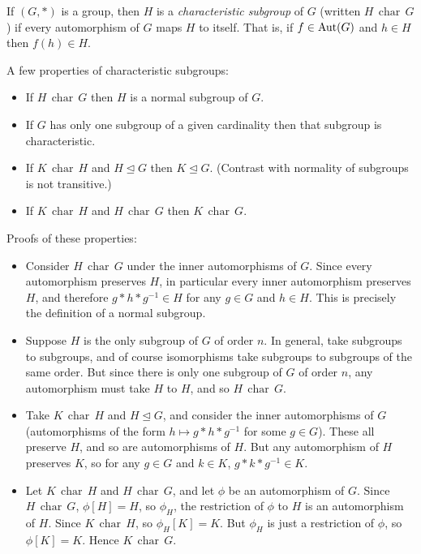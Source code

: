 \documentclass[12pt]{article}
\DeclareMathOperator{\Char}{\,char\,}
\begin{document}

If $(G,*)$ is a group, then $H$ is a \emph{characteristic subgroup} of $G$ (written $H \Char G$) if every automorphism of $G$ maps $H$ to itself.  That is, if $f\in{\rm Aut}(G)$ and $h\in H$ then $f(h)\in H$.

A few properties of characteristic subgroups:
\begin{itemize}
\item If $H\Char G$ then $H$ is a normal subgroup of $G$.
\item If $G$ has only one subgroup of a given cardinality then that subgroup is characteristic.
\item If $K\Char H$ and $H\trianglelefteq G$ then $K\trianglelefteq G$. (Contrast with normality of subgroups is not transitive.)
\item If $K\Char H$ and $H\Char G$ then $K\Char G$.
\end{itemize}

Proofs of these properties:
\begin{itemize}
\item Consider $H\Char G$ under the inner automorphisms of $G$.  Since every automorphism preserves $H$, in particular every inner automorphism preserves $H$, and therefore $g*h*g^{-1}\in H$ for any $g\in G$ and $h\in H$.  This is precisely the definition of a normal subgroup.
\item Suppose $H$ is the only subgroup of $G$ of order $n$.  In general,  take subgroups to subgroups, and of course isomorphisms take subgroups to subgroups of the same order.  But since there is only one subgroup of $G$ of order $n$, any automorphism must take $H$ to $H$, and so $H\Char G$.
\item Take $K\Char H$ and $H\trianglelefteq G$, and consider the inner automorphisms of $G$ (automorphisms of the form $h\mapsto g*h*g^{-1}$ for some $g\in G$).  These all preserve $H$, and so are automorphisms of $H$.  But any automorphism of $H$ preserves $K$, so for any $g\in G$ and $k\in K$, $g*k*g^{-1}\in K$.
\item Let $K\Char H$ and $H\Char G$, and let $\phi$ be an automorphism of $G$.  Since $H\Char G$, $\phi[H]=H$, so $\phi_H$, the restriction of $\phi$ to $H$ is an automorphism of $H$.  Since $K\Char H$, so $\phi_H[K]=K$.  But $\phi_H$ is just a restriction of $\phi$, so $\phi[K]=K$.  Hence $K\Char G$.
\end{itemize}
\end{document}
